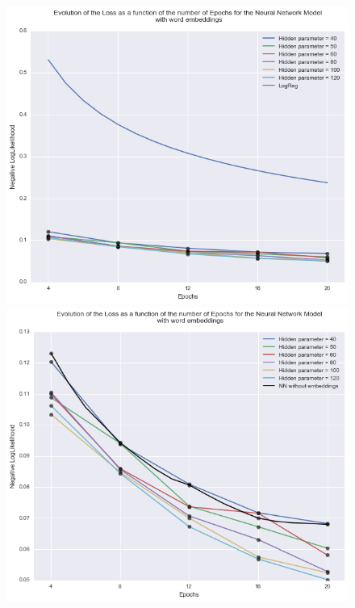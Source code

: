 \documentclass[11pt]{article}
\begin{document}
\newpage
\begin{figure}[H]
\centering
\begin{minipage}{.4\textwidth}
  \centering
  \includegraphics[width=1.2\linewidth]{compa}
\end{minipage} 
\hfill
\begin{minipage}{.4\textwidth}
  \centering
  \includegraphics[width=1.2\linewidth]{nn_embed}
\end{minipage}
\end{figure}
\end{document}
